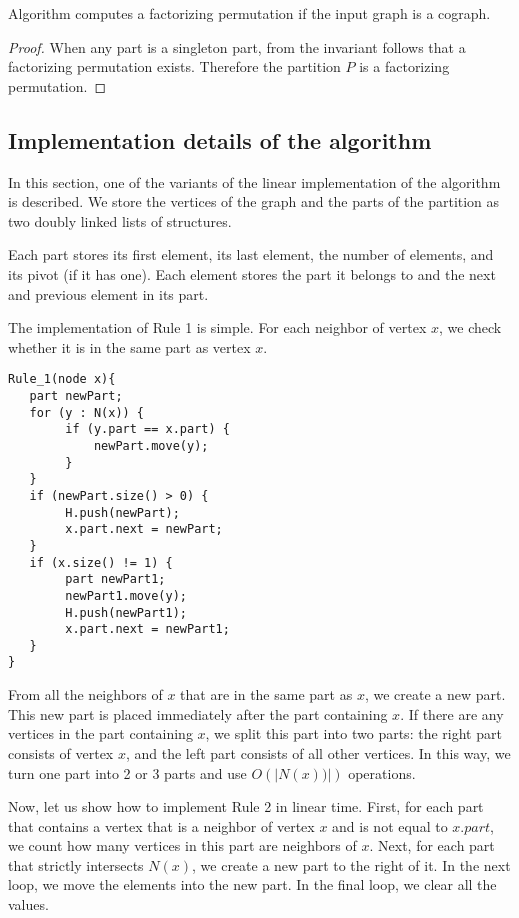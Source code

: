 \begin{theorem}
Algorithm  computes a factorizing permutation if the input graph is a cograph.
\end{theorem}

\begin{proof}
When any part is a singleton part, from the invariant follows that a factorizing permutation exists. Therefore the partition $P$ is a factorizing permutation.
\end{proof}

\subsection{Implementation details of the algorithm}
In this section, one of the variants of the linear implementation of the algorithm is described. We store the vertices of the graph and the parts of the partition as two doubly linked lists of structures.


Each part stores its first element, its last element, the number of elements, and its pivot (if it has one). Each element stores the part it belongs to and the next and previous element in its part.


The implementation of Rule 1 is simple. For each neighbor of vertex $x$, we check whether it is in the same part as vertex $x$.

\begin{verbatim}
Rule_1(node x){
   part newPart;
   for (y : N(x)) {
        if (y.part == x.part) {
            newPart.move(y);
        }
   }
   if (newPart.size() > 0) {
        H.push(newPart);
        x.part.next = newPart;
   }
   if (x.size() != 1) {
        part newPart1;
        newPart1.move(y);
        H.push(newPart1);
        x.part.next = newPart1;
   }
}
\end{verbatim}

From all the neighbors of $x$ that are in the same part as $x$, we create a new part. This new part is placed immediately after the part containing $x$. If there are any vertices in the part containing $x$, we split this part into two parts: the right part consists of vertex $x$, and the left part consists of all other vertices. In this way, we turn one part into 2 or 3 parts and use 
$O(|N(x))|)$ operations.

Now, let us show how to implement Rule 2 in linear time. First, for each part that contains a vertex that is a neighbor of vertex $x$ and is not equal to $x.part$, we count how many vertices in this part are neighbors of $x$.
Next, for each part that strictly intersects $N(x)$, we create a new part to the right of it. In the next loop, we move the elements into the new part.
In the final loop, we clear all the values.


